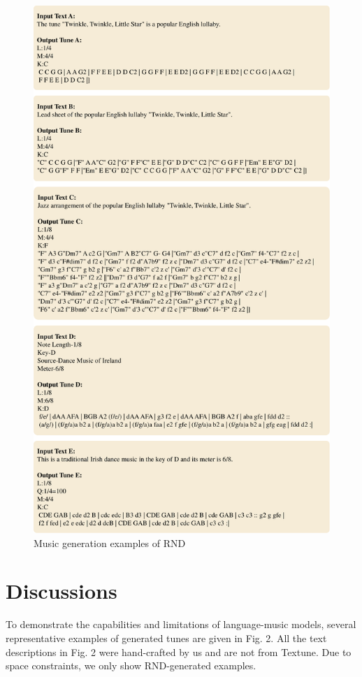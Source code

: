 \documentclass[letterpaper]{article} %
\begin{document}
\begin{figure}[t]
    \centering
    \begin{minipage}{8.25cm}
        \includegraphics[width=\textwidth]{fig2.pdf}
    \end{minipage}
    \centering
    \caption{Music generation examples of RND}
\end{figure}
\section{Discussions}
To demonstrate the capabilities and limitations of language-music models, several representative examples of generated tunes are given in Fig. 2. All the text descriptions in Fig. 2 were hand-crafted by us and are not from Textune. Due to space constraints, we only show RND-generated examples.
\end{document}
